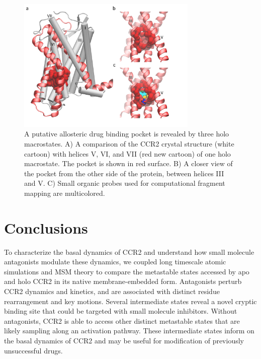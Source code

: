 \documentclass[9pt,twocolumn,twoside]{pnas-new}
\begin{document}
\begin{figure}[ht]
\centering
\includegraphics[width=8.6cm]{allo_pkt.pdf}
\caption{A putative allosteric drug binding pocket is revealed by three holo macrostates. A) A comparison of the CCR2 crystal structure (white cartoon) with helices V, VI, and VII (red new cartoon) of one holo macrostate. The pocket is shown in red surface. B) A closer view of the pocket from the other side of the protein, between helices III and V. C) Small organic probes used for computational fragment mapping are multicolored.}
\label{fig:allo_pkt}
\end{figure}

\section*{Conclusions}

To characterize the basal dynamics of CCR2 and understand how small molecule antagonists modulate these dynamics, we coupled long timescale atomic simulations and MSM theory to compare the metastable states accessed by apo and holo CCR2 in its native membrane-embedded form. 
Antagonists perturb CCR2 dynamics and kinetics, and are associated with distinct residue rearrangement and key motions. 
Several intermediate states reveal a novel cryptic binding site that could be targeted with small molecule inhibitors. 
Without antagonists, CCR2 is able to access other distinct metastable states that are likely sampling along an activation pathway. These intermediate states inform on the basal dynamics of CCR2 and may be useful for modification of previously unsuccessful drugs.

\end{document}
